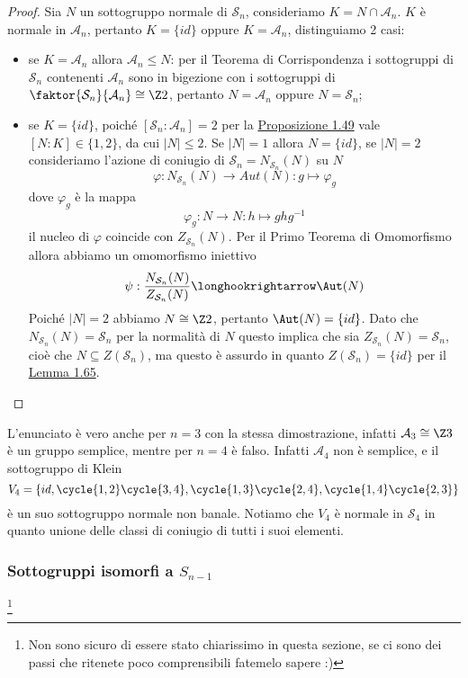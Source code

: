 \documentclass[11pt]{scrartcl}
\begin{document}
	\begin{proof}
		Sia $N$ un sottogruppo normale di $\mathcal{S}_n$, consideriamo $K= N \cap \mathcal{A}_n$.
		$K$ è normale in $\mathcal{A}_n$, pertanto $K = \{id\}$ oppure $K = \mathcal{A}_n$,
		distinguiamo 2 casi:
		\begin{itemize}
			\item se $K = \mathcal{A}_n$ allora $\mathcal{A}_n \leqslant N$: per il
			Teorema di Corrispondenza i sottogruppi di $\mathcal{S}_n$ contenenti $\mathcal{A}_n$
			sono in bigezione con i sottogruppi di $\faktor{\mathcal{S}_n}{\mathcal{A}_n}\cong \Z2$,
			pertanto $N = \mathcal{A}_n$ oppure $N = \mathcal{S}_n$;
			\item se $K = \{id\}$, poiché $[\mathcal{S}_n:\mathcal{A}_n] = 2$ per la 
			\hyperref[prop1.49]{Proposizione 1.49} vale $[N:K] \in \{1, 2\}$, 
			da cui $|N| \leq 2$. Se $|N| = 1$ allora $N = \{id\}$, se $|N| = 2$
			consideriamo l'azione di coniugio di $\mathcal{S}_n = N_{\mathcal{S}_n}(N)$ su $N$
			\[
			\varphi: N_{\mathcal{S}_n}(N)\longrightarrow Aut(N): g \longmapsto \varphi_g
			\]
			dove $\varphi_g$ è la mappa
			\[
			\varphi_g:N \longrightarrow N :h \longmapsto ghg^{-1}
			\]
			il nucleo di $\varphi$ coincide con $Z_{\mathcal{S}_n}(N)$. Per il Primo Teorema
			di Omomorfismo allora abbiamo un omomorfismo iniettivo
			\[
			\psi :\frac{N_{\mathcal{S}_n}(N)}{Z_{\mathcal{S}_n}(N)}\longhookrightarrow \Aut(N)
			\]
			Poiché $|N| = 2$ abbiamo $N \cong \Z2$, pertanto $\Aut(N) = \{id\}$. 
			Dato che $N_{\mathcal{S}_n}(N) = \mathcal{S}_n$ per la normalità di $N$ questo implica che
			sia $Z_{\mathcal{S}_n}(N) = \mathcal{S}_n$, cioè che $N \subseteq Z(\mathcal{S}_n)$, ma questo è assurdo
			in quanto $Z(\mathcal{S}_n) = \{id\}$ per il \hyperref[lemma1.65]{Lemma 1.65}.
		\end{itemize}
	\end{proof}
	
	\begin{remark}
		L'enunciato è vero anche per $n = 3$ con la stessa dimostrazione, infatti
		$\mathcal{A}_3 \cong \Z3$ è un gruppo semplice, mentre per $n = 4$ è falso.
		Infatti $\mathcal{A}_4$ non è semplice, e il sottogruppo di Klein
		\[
		V_4 = \{id, \cycle{1, 2}\cycle{3, 4}, \cycle{1, 3}\cycle{2, 4}, \cycle{1, 4}\cycle{2, 3}\}
		\]
		è un suo sottogruppo normale non banale. Notiamo che $V_4$ è normale in 
		$\mathcal{S}_4$ in quanto unione delle classi di coniugio di tutti i suoi elementi.
	\end{remark}
	
	
	\subsubsection{Sottogruppi isomorfi a $S_{n - 1}$}\footnote{
		Non sono sicuro di essere stato chiarissimo in questa sezione, se ci 
		sono dei passi che ritenete poco comprensibili fatemelo sapere :)
	}
	
\end{document}
